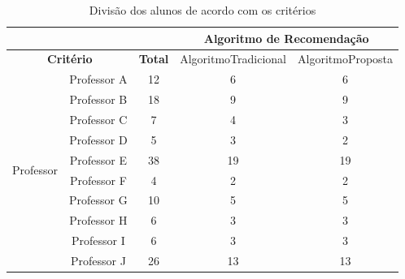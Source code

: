 \begin{table}[h]
\footnotesize
\caption[Divisão dos alunos de acordo com os critérios]{Divisão dos alunos de acordo com os critérios}
\label{tab:divisao-alunos-experimento}
\centering
\begin{tabular}{|c|c|c|c|c|}
  \hline
  \multicolumn{3}{|c|}{}                                                                         & \multicolumn{2}{c|}{\textbf{Algoritmo de Recomendação}} \\ \hline
  \multicolumn{2}{|c|}{\textbf{Critério}}                  & \multicolumn{1}{c|}{\textbf{Total}} & AlgoritmoTradicional & AlgoritmoProposta                \\ \hline
  \multirow{12}{*}{Professor}           & Professor A      & 12                                  & 6                    & 6                                \\
                                        & Professor B      & 18                                  & 9                    & 9                                \\
                                        & Professor C      & 7                                   & 4                    & 3                                \\
                                        & Professor D      & 5                                   & 3                    & 2                                \\
                                        & Professor E      & 38                                  & 19                   & 19                               \\
                                        & Professor F      & 4                                   & 2                    & 2                                \\
                                        & Professor G      & 10                                  & 5                    & 5                                \\
                                        & Professor H      & 6                                   & 3                    & 3                                \\
                                        & Professor I      & 6                                   & 3                    & 3                                \\
                                        & Professor J      & 26                                  & 13                   & 13                               \\

\end{tabular}
\end{table}
